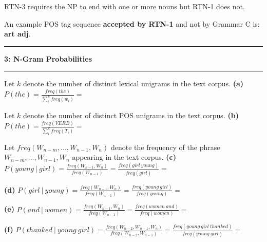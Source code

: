 \documentclass[11pt]{article}
\newcommand\question[2]{\vspace{.25in}\hrule\textbf{#1: #2}\vspace{.5em}\hrule\vspace{.10in}}
\renewcommand\part[1]{\vspace{.10in}\textbf{(#1)}}
\begin{document}
RTN-3 requires the NP to end with one or more nouns but RTN-1 does not.

An example POS tag sequence \textbf{accepted by RTN-1} and not by Grammar C is: \textbf{art adj}.

\newpage

\question{3}{N-Gram Probabilities}

Let $k$ denote the number of distinct lexical unigrams in the text corpus. \newline
\part{a} $P(the) = \frac{freq(the)}{\sum\limits_{i}^{k} freq(w_i)} = \ $ 

Let $k$ denote the number of distinct POS unigrams in the text corpus. \newline
\part{b} $P(the) = \frac{freq(VERB)}{\sum\limits_{i}^{k} freq(T_i)} = \ $

Let $freq(W_{n-m},...,W_{n-1}, W_{n})$ denote the frequency of the phrase $W_{n-m},...,W_{n-1}, W_{n}$ appearing in the text corpus. \newline
\part{c} $P(young \ | \ girl) = \frac{freq(W_{n-1}, W_n)}{freq(W_{n-1})} = \frac{freq(girl \ young)}{freq(girl)} = \ $

\part{d} $P(girl \ | \ young) = \frac{freq(W_{n-1}, W_n)}{freq(W_{n-1})} = \frac{freq(young \ girl)}{freq(young)} = \ $

\part{e} $P(and \ | \ women) = \frac{freq(W_{n-1}, W_n)}{freq(W_{n-1})} = \frac{freq(women \ and)}{freq(women)} = \ $

\part{f} $P(thanked \ | \ young \ girl) = \frac{freq(W_{n-2}, W_{n-1}, W_n)}{freq(W_{n-2}, W_{n-1})} = \frac{freq(young \ girl \ thanked)}{freq(young \ girl)} = \ $
\end{document}
